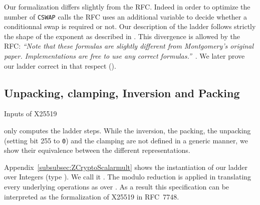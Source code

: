 Our formalization differs slightly from the RFC. Indeed in order to optimize the
number of \texttt{CSWAP} calls the RFC uses an additional variable to decide
whether a conditionnal swap is required or not. Our description of the ladder
follows strictly the shape of the exponent as described in .
This divergence is allowed by the RFC:
\emph{``Note that these formulas are slightly different from Montgomery's
original paper.  Implementations are free to use any correct formulas.''}~\cite{rfc7748}.
We later prove our ladder correct in that respect ().




\subsection{Unpacking, clamping, Inversion and Packing}
\label{subsec:spec-unpack-clamp-inv-pack}

Inputs of X25519


 only computes the ladder steps.
While the inversion, the packing, the unpacking (setting bit 255 to \texttt{0})
and the clamping are not defined in a generic manner, we show their equivalence
between the different representations.

Appendix~\ref{subsubsec:ZCryptoScalarmult} shows the instantiation of our ladder
over Integers (type ). We call it .
The modulo reduction is applied in  translating every
underlying operations as over \Zfield. As a result this specification can be
interpreted as the formalization of X25519 in RFC~7748.
